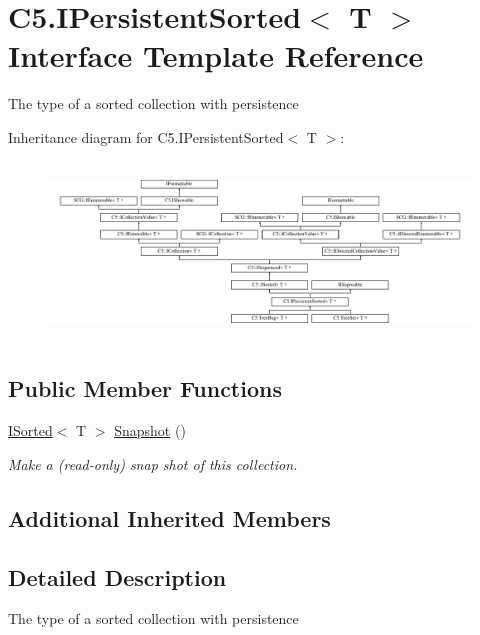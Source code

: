 \hypertarget{interface_c5_1_1_i_persistent_sorted}{}\section{C5.\+I\+Persistent\+Sorted$<$ T $>$ Interface Template Reference}
\label{interface_c5_1_1_i_persistent_sorted}


The type of a sorted collection with persistence  


Inheritance diagram for C5.\+I\+Persistent\+Sorted$<$ T $>$\+:\begin{figure}[H]
\begin{center}
\leavevmode
\includegraphics[height=4.732394cm]{interface_c5_1_1_i_persistent_sorted}
\end{center}
\end{figure}
\subsection*{Public Member Functions}
\begin{DoxyCompactItemize}
\item 
\hyperlink{interface_c5_1_1_i_sorted}{I\+Sorted}$<$ T $>$ \hyperlink{interface_c5_1_1_i_persistent_sorted_a9d03a4971aaffbf7c93b7aaeedca282e}{Snapshot} ()
\begin{DoxyCompactList}\small\item\em Make a (read-\/only) snap shot of this collection. \end{DoxyCompactList}\end{DoxyCompactItemize}
\subsection*{Additional Inherited Members}


\subsection{Detailed Description}
The type of a sorted collection with persistence 



